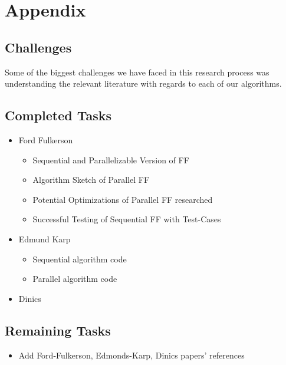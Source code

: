 \section{Appendix}

\subsection{Challenges}
    Some of the biggest challenges we have faced in this research process was understanding the relevant literature with regards to each of our algorithms.

\subsection{Completed Tasks}
    \begin{itemize}
        \item Ford Fulkerson
            \begin{itemize}
                \item Sequential and Parallelizable Version of FF
                \item Algorithm Sketch of Parallel FF
                \item Potential Optimizations of Parallel FF researched
                \item Successful Testing of Sequential FF with Test-Cases
            \end{itemize}
        \item Edmund Karp
            \begin{itemize}
                \item Sequential algorithm code
                \item Parallel algorithm code
            \end{itemize}
        \item Dinics
    \end{itemize}
\subsection{Remaining Tasks}
    \begin{itemize}
        \item Add Ford-Fulkerson, Edmonds-Karp, Dinics papers' references
    \end{itemize}